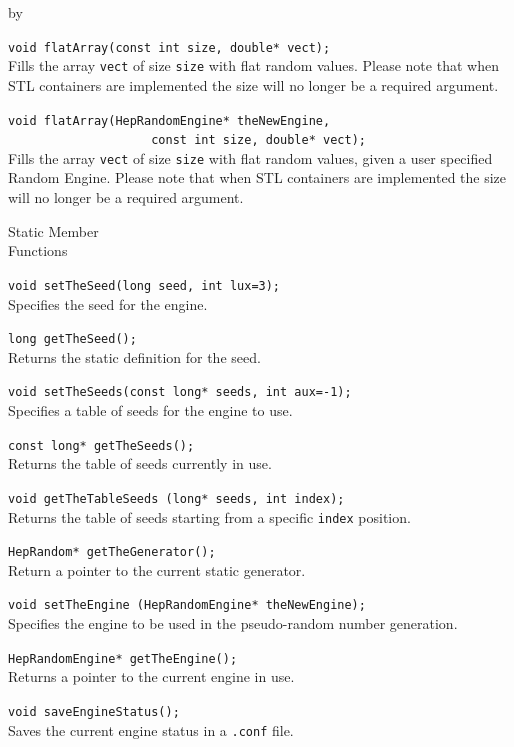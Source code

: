 \documentclass[twoside]{article}
\newcommand{\comp}[1]{\texttt{#1}}%
\newcommand{\entrylabel}[1]{\mbox{\textbf{{#1}}}\hfil}%
\newenvironment{entry}
{\begin{list}{}%
    {\renewcommand{\makelabel}{\entrylabel}%
     \setlength{\labelwidth}{90pt}%
     \setlength{\leftmargin}{\labelwidth}
     \advance\leftmargin by \labelsep%
      }%
    }%
  {\end{list}}
\newcommand{\Entrylabel}[1]%
{\raisebox{0pt}[1ex][0pt]{\makebox[\labelwidth][l]%
    {\parbox[t]{\labelwidth}{\hspace{0pt}\textbf{{#1}}}}}}
\newenvironment{Entry}%
{\renewcommand{\entrylabel}{\Entrylabel}\begin{entry}}%
  {\end{entry}}
\begin{document}
\begin{description}
\begin{Entry}
    \verb+void flatArray(const int size, double* vect);+\\
    Fills the array \comp{vect} of size \comp{size}
    with flat random values.  Please note that when STL containers are
    implemented the size will no longer be a required argument.

    \verb+void flatArray(HepRandomEngine* theNewEngine,+\\ 
    \verb+                    const int size, double* vect);+\\
    Fills the array \comp{vect} of size \comp{size} with flat
    random values, given a user specified Random Engine.
    Please note that when STL containers are implemented the size
    will no longer be a required argument.

\item[Static Member\\ Functions]

    \verb+void setTheSeed(long seed, int lux=3);+\\
    Specifies the seed for the engine.

    \verb+long getTheSeed();+\\
    Returns the static definition for the seed.

    \verb+void setTheSeeds(const long* seeds, int aux=-1);+\\
    Specifies a table of seeds for the engine to use.

    \verb+const long* getTheSeeds();+\\
    Returns the table of seeds currently in use.

    \verb+void getTheTableSeeds (long* seeds, int index);+\\
    Returns the table of seeds starting from a specific \comp{index}
    position.

    \verb+HepRandom* getTheGenerator();+\\
    Return a pointer to the current static generator.

    \verb+void setTheEngine (HepRandomEngine* theNewEngine);+\\
    Specifies the engine to be used in the pseudo-random number generation.

    \verb+HepRandomEngine* getTheEngine();+\\
    Returns a pointer to the current engine in use.

    \verb+void saveEngineStatus();+\\
    Saves the current engine status in a \comp{.conf} file.
    

\end{Entry}
\end{description}
\end{document}
